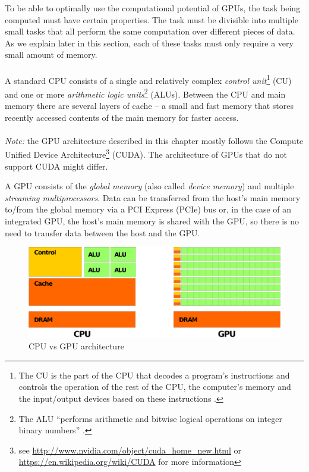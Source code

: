 \documentclass[12pt,oneside]{fithesis2}
\begin{document}
      To be able to optimally use the computational potential of GPUs, the task being computed must have certain properties. The task must be divisible into multiple small tasks that all perform the same computation over different pieces of data. As we explain later in this section, each of these tasks must only require a very small amount of memory.
      
      \paragraph*{}
      A standard CPU consists of a single and relatively complex \emph{control unit}\footnote{The CU is the part of the CPU that decodes a program's instructions and controls the operation of the rest of the CPU, the computer's memory and the input/output devices based on these instructions \cite{wiki:CU}.} (CU) and one or more \emph{arithmetic logic units}\footnote{The ALU ``performs arithmetic and bitwise logical operations on integer binary numbers'' \cite{wiki:ALU}.} (ALUs). Between the CPU and main memory there are several layers of cache -- a small and fast memory that stores recently accessed contents of the main memory for faster access.
      
      \paragraph*{}
      \emph{Note:} the GPU architecture described in this chapter mostly follows the Compute Unified Device Architecture\footnote{see \url{http://www.nvidia.com/object/cuda_home_new.html} or \url{https://en.wikipedia.org/wiki/CUDA} for more information} (CUDA). The architecture of GPUs that do not support CUDA might differ.
      
      A GPU consists of the \emph{global memory} (also called \emph{device memory}) and multiple \emph{streaming multiprocessors}. Data can be transferred from the host's main memory to/from the global memory via a PCI Express (PCIe) bus or, in the case of an integrated GPU, the host's main memory is shared with the GPU, so there is no need to transfer data between the host and the GPU.
      
      \begin{figure}
        \centering
        \includegraphics[width=\linewidth]{images/gpu-vs-cpu.eps}
        \caption{CPU vs GPU architecture\protect\footnotemark}
      \end{figure}
      
\end{document}
